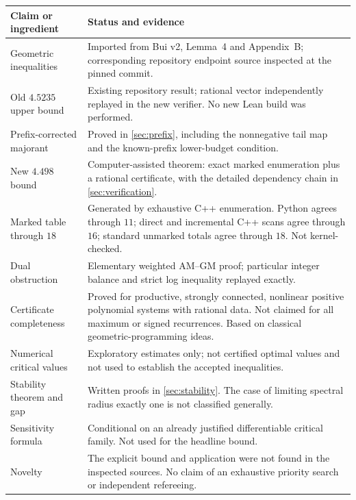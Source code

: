 \documentclass[11pt,a4paper]{article}
\theoremstyle{definition}
\theoremstyle{remark}
\begin{document}
\begin{longtable}{@{}p{}p{}@{}}
\toprule
Claim or ingredient & Status and evidence\\
\midrule
\endhead
Geometric inequalities & Imported from Bui v2, Lemma~4 and Appendix~B; corresponding
repository endpoint source inspected at the pinned commit.\\[0.4em]
Old $4.5235$ upper bound & Existing repository result; rational vector independently
replayed in the new verifier. No new Lean build was performed.\\[0.4em]
Prefix-corrected majorant & Proved in \cref{sec:prefix}, including the nonnegative tail
map and the known-prefix lower-budget condition.\\[0.4em]
New $4.498$ bound & Computer-assisted theorem: exact marked enumeration plus a rational
certificate, with the detailed dependency chain in \cref{sec:verification}.\\[0.4em]
Marked table through $18$ & Generated by exhaustive C++ enumeration. Python agrees through
$11$; direct and incremental C++ scans agree through $16$; standard unmarked
totals agree through $18$. Not kernel-checked.\\[0.4em]
Dual obstruction & Elementary weighted AM--GM proof; particular integer balance and
strict log inequality replayed exactly.\\[0.4em]
Certificate completeness & Proved for productive, strongly connected, nonlinear positive
polynomial systems with rational data. Not claimed for all maximum or signed
recurrences. Based on classical geometric-programming ideas.\\[0.4em]
Numerical critical values & Exploratory estimates only; not certified optimal values and
not used to establish the accepted inequalities.\\[0.4em]
Stability theorem and gap & Written proofs in \cref{sec:stability}. The case of limiting
spectral radius exactly one is not classified generally.\\[0.4em]
Sensitivity formula & Conditional on an already justified differentiable critical
family. Not used for the headline bound.\\[0.4em]
Novelty & The explicit bound and application were not found in the inspected sources.
No claim of an exhaustive priority search or independent refereeing.\\
\bottomrule
\end{longtable}
\end{document}
